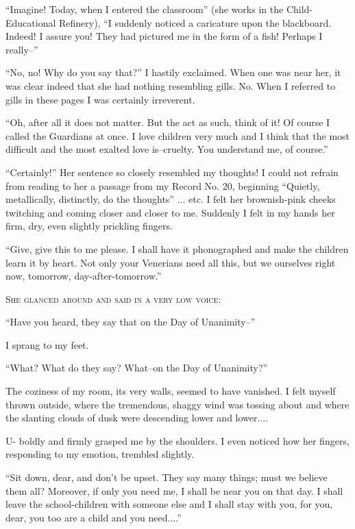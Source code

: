 \documentclass[11pt,openany]{book}
\begin{document}
``Imagine! Today, when I entered the classroom'' (she works in the Child-Educational Refinery), ``I suddenly noticed a caricature upon the blackboard. Indeed! I assure you! They had pictured me in the form of a fish! Perhaps I really--''

``No, no! Why do you say that?'' I hastily exclaimed. When one was near her, it was clear indeed that she had nothing resembling gills. No. When I referred to gills in these pages I was certainly irreverent.

``Oh, after all it does not matter. But the act as such, think of it! Of course I called the Guardians at once. I love children very much and I think that the most difficult and the most exalted love is--cruelty. You understand me, of course.''

``Certainly!'' Her sentence so closely resembled my thoughts! I could not refrain from reading to her a passage from my Record No. 20, beginning ``Quietly, metallically, distinctly, do the thoughts'' ... etc. I felt her brownish-pink cheeks twitching and coming closer and closer to me. Suddenly I felt in my hands her firm, dry, even slightly prickling fingers.

``Give, give this to me please. I shall have it phonographed and make the children learn it by heart. Not only your Venerians need all this, but we ourselves right now, tomorrow, day-after-tomorrow.''

\begin{center}\textsc{She glanced around and said in a very low voice:}\end{center}

``Have you heard, they say that on the Day of Unanimity--''

I sprang to my feet.

``What? What do they say? What--on the Day of Unanimity?''

The coziness of my room, its very walls, seemed to have vanished. I felt myself thrown outside, where the tremendous, shaggy wind was tossing about and where the slanting clouds of dusk were descending lower and lower....

U- boldly and firmly grasped me by the shoulders. I even noticed how her fingers, responding to my emotion, trembled slightly.

``Sit down, dear, and don't be upset. They say many things; must we believe them all? Moreover, if only you need me, I shall be near you on that day. I shall leave the school-children with someone else and I shall stay with you, for you, dear, you too are a child and you need....''
\end{document}
